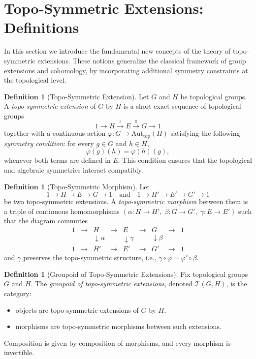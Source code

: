 \documentclass[11pt,a4paper]{article}
\theoremstyle{plain}
\theoremstyle{definition}
\newtheorem{definition}[theorem]{Definition}
\theoremstyle{remark}
\begin{document}
	\section{Topo-Symmetric Extensions: Definitions}
	
	In this section we introduce the fundamental new concepts of the theory of topo-symmetric extensions. 
	These notions generalize the classical framework of group extensions and cohomology, by incorporating 
	additional symmetry constraints at the topological level.
	
	
	\begin{definition}[Topo-Symmetric Extension]
		Let $G$ and $H$ be topological groups. 
		A \emph{topo-symmetric extension} of $G$ by $H$ is a short exact sequence of topological groups
		\[
		1 \longrightarrow H \overset{\iota}{\longrightarrow} E \overset{\pi}{\longrightarrow} G \longrightarrow 1
		\]
		together with a continuous action $\varphi : G \to \mathrm{Aut}_{\mathrm{top}}(H)$ satisfying the following \emph{symmetry condition}:
		for every $g \in G$ and $h \in H$,
		\[
		\varphi(g)(h) = \varphi(h)(g),
		\]
		whenever both terms are defined in $E$. 
		This condition ensures that the topological and algebraic symmetries interact compatibly.
	\end{definition}
	
	\begin{definition}[Topo-Symmetric Morphism]
		Let 
		\[
		1 \to H \to E \to G \to 1
		\quad \text{and} \quad
		1 \to H' \to E' \to G' \to 1
		\]
		be two topo-symmetric extensions. 
		A \emph{topo-symmetric morphism} between them is a triple of continuous homomorphisms 
		$(\alpha : H \to H',\; \beta : G \to G',\; \gamma : E \to E')$
		such that the diagram commutes
		\[
		\begin{array}{ccccccccc}
			1 & \to & H & \to & E & \to & G & \to & 1 \\
			&     & \downarrow \alpha & & \downarrow \gamma & & \downarrow \beta & &   \\
			1 & \to & H' & \to & E' & \to & G' & \to & 1
		\end{array}
		\]
		and $\gamma$ preserves the topo-symmetric structure, i.e., 
		$\gamma \circ \varphi = \varphi' \circ \beta$.
	\end{definition}
	
	\begin{definition}[Groupoid of Topo-Symmetric Extensions]
		Fix topological groups $G$ and $H$. 
		The \emph{groupoid of topo-symmetric extensions}, denoted $\mathcal{T}(G,H)$, is the category:
		\begin{itemize}
			\item objects are topo-symmetric extensions of $G$ by $H$,
			\item morphisms are topo-symmetric morphisms between such extensions.
		\end{itemize}
		Composition is given by composition of morphisms, and every morphism is invertible.
	\end{definition}
	
\end{document}
